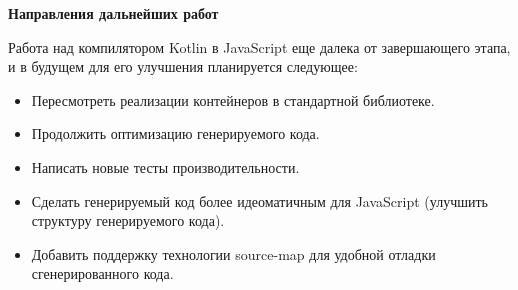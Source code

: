 \null
\begin{LARGE}
\begin{center}
\textbf{Направления дальнейших работ}
\end{center}
\end{LARGE}

Работа над компилятором Kotlin в JavaScript еще далека от завершающего этапа, и в будущем для его улучшения планируется следующее:
\begin{itemize}
\item Пересмотреть реализации контейнеров в стандартной библиотеке.
\item Продолжить оптимизацию генерируемого кода.
\item Написать новые тесты производительности. 
\item Сделать генерируемый код более идеоматичным для JavaScript (улучшить структуру генерируемого кода).
\item Добавить поддержку технологии source-map \cite{SourceMap3} для удобной отладки сгенерированного кода.
\end{itemize}